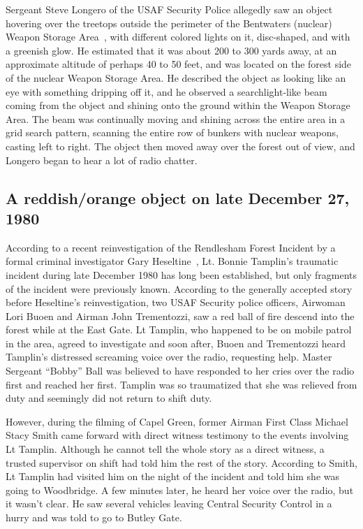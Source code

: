 Sergeant Steve Longero of the USAF Security Police
allegedly saw an object hovering over the treetops outside the perimeter of the Bentwaters (nuclear) Weapon Storage Area~\cite{Heseltine2023Feb,FleischerHeseltine2023April},
with  different colored lights on it,
disc-shaped, and with a greenish glow. He estimated that it was about 200 to 300 yards away, at an approximate altitude of perhaps 40 to 50 feet,
 and was located on the forest side of the nuclear Weapon Storage Area.
He described the object as looking like an eye with something dripping off it, and he observed a searchlight-like beam coming from the object
and shining onto the ground within the Weapon Storage Area.
The beam was continually moving and shining across the entire area in a grid search pattern,
scanning the entire row of bunkers with nuclear weapons, casting left to right.
The object then moved away over the forest out of view, and Longero began to hear a lot of radio chatter.


\subsection{A reddish/orange object on late December 27, 1980}

According to a recent reinvestigation of the Rendlesham Forest Incident by a formal criminal investigator Gary Heseltine~\cite{Heseltine2023Feb},
Lt. Bonnie Tamplin's traumatic incident during late December 1980 has long been established, but only fragments of the incident were previously known.
According to the generally accepted story before Heseltine's reinvestigation,
two USAF Security police officers, Airwoman Lori Buoen and Airman John Trementozzi, saw a red ball of fire descend into the forest while at the East Gate.
Lt Tamplin, who happened to be on mobile patrol in the area,
agreed to investigate and soon after, Buoen and Trementozzi heard Tamplin's distressed screaming voice over the radio, requesting help.
Master Sergeant ``Bobby'' Ball was believed to have responded to her cries over the radio first and reached her first.
Tamplin was so traumatized that she was relieved from duty and seemingly did not return to shift duty.

However, during the filming of Capel Green, former Airman First Class Michael Stacy Smith came forward with direct witness testimony to the events involving Lt Tamplin.
Although he cannot tell the whole story as a direct witness,
a trusted supervisor on shift had told him the rest of the story.
According to Smith, Lt Tamplin had visited him on the night of the incident and told him she was going to Woodbridge.
A few minutes later, he heard her voice over the radio, but it wasn't clear.
He saw several vehicles leaving Central Security Control in a hurry and was told to go to Butley Gate.

